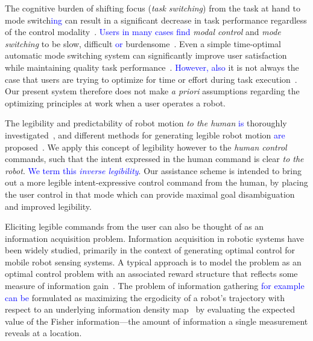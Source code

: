 \documentclass[conference]{IEEEtran}
\begin{document}
The cognitive burden of shifting focus (\textit{task switching}) from the task at hand to mode switch\textcolor{blue}{ing} can result in a significant decrease in task performance regardless of the control modality~\cite{monsell2003task}. \textcolor{blue}{Users in many cases find} \textit{modal control} and \textit{mode switching} to be slow, difficult \textcolor{blue}{or} burdensome~\cite{herlant2016assistive}. Even a simple time-optimal automatic mode switching system can significantly improve user satisfaction while maintaining quality task performance~\cite{herlant2016assistive}. \textcolor{blue}{However, also} it is not always the case that users are trying to optimize for time or effort during task execution~\cite{gopinath2017human}. Our present system therefore does not make \textit{a priori} assumptions regarding the optimizing principles at work when a user operates a robot.

The legibility and predictability of robot motion \textit{to the human} \textcolor{blue}{is} thoroughly investigated~\cite{dragan2013legibility}, and different methods for generating legible robot motion \textcolor{blue}{are} proposed~\cite{holladay2014legible}. We apply this concept of legibility however to the \textit{human control} commands, such that the intent expressed in the human command is clear \textit{to the robot}. \textcolor{blue}{We term this \textit{inverse legibility}}. Our assistance scheme is intended to bring out a more legible intent-expressive control command from the human, by placing the user control in that mode which can provide maximal goal disambiguation and improved legibility.

Eliciting legible commands from the user can also be thought of as an information acquisition problem. Information acquisition in robotic systems  have been widely studied, primarily in the context of generating optimal control for mobile robot sensing systems. A typical approach is to model the problem as an optimal control problem with an associated reward structure that reflects some measure of information gain~\cite{atanasov2014information}. The problem of information gathering \textcolor{blue}{for example can be} formulated as maximizing the ergodicity of a robot's trajectory with respect to an underlying information density map~\cite{miller2013trajectory,miller2016ergodic} by evaluating the expected value of the Fisher information---the amount of information a single measurement reveals at a location. 
\end{document}
